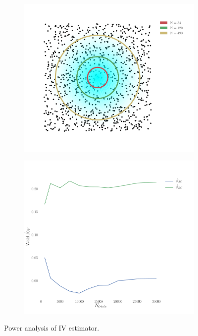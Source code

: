 \documentclass[11pt]{article}
\begin{document}
\begin{figure}
\makeatletter
\renewcommand\p@subfigure{}
\makeatother
\begin{subfigure}{0.485\textwidth} \includegraphics[scale=.2]{network_stim}
\caption{} \label{fig:network-power:1}
\end{subfigure}\hfill
\begin{subfigure}{0.485\textwidth}\includegraphics[scale=.2]{wald_network}
\caption{} \label{fig:network-power:2}
\end{subfigure}

\caption{Power analysis of IV estimator. \label{fig:network-power}}
\end{figure}
\end{document}
